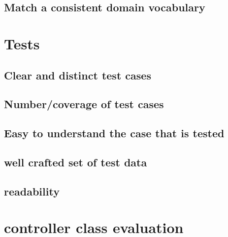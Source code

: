 \documentclass[a4wide]{article}
\begin{document}
\subsection{Match a consistent domain vocabulary}
\section{Tests}
\subsection{Clear and distinct test cases}
\subsection{Number/coverage of test cases}
\subsection{Easy to understand the case that is tested}
\subsection{well crafted set of test data}
\subsection{readability}
\section{controller class evaluation}
\end{document}
